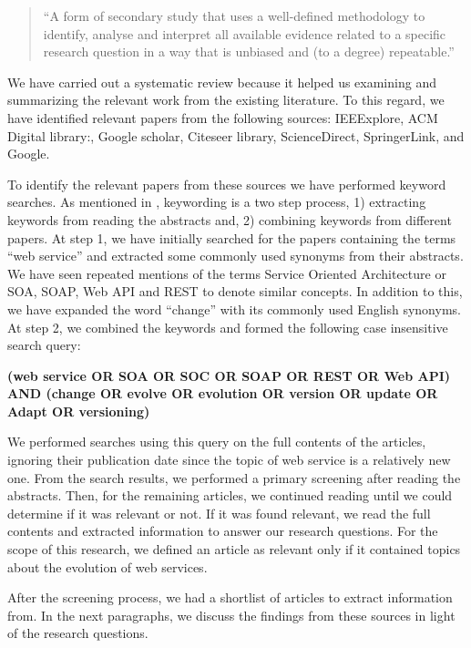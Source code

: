 \documentclass[runningheads,a4paper]{llncs}
\begin{document}
\begin{quote}
``A form of secondary study that uses a well-defined methodology to identify, analyse and interpret all available evidence related to a specific research question in a way that is unbiased and (to a degree) repeatable.''
\end{quote}
We have carried out a systematic review because it helped us examining and summarizing the relevant work from the existing literature. To this regard, we have identified relevant papers from the following sources: IEEExplore, ACM Digital library:, Google scholar, Citeseer library, ScienceDirect, SpringerLink, and Google.

To identify the relevant papers from these sources we have performed keyword searches. As mentioned in \cite{petersen2008systematic}, keywording is a two step process, 1) extracting keywords from reading the abstracts and, 2) combining keywords from different papers. At step 1, we have initially searched for the papers containing the terms ``web service'' and extracted some commonly used synonyms from their abstracts. We have seen repeated mentions of the terms Service Oriented Architecture or SOA, SOAP, Web API and REST to denote similar concepts. In addition to this, we have expanded the word ``change'' with its commonly used English synonyms. At step 2, we combined the keywords and formed the following case insensitive search query:

\textbf{(web service OR SOA OR SOC OR SOAP OR REST OR Web API)  AND (change OR evolve OR evolution OR version OR update OR Adapt OR versioning)}

We performed searches using this query on the full contents of the articles, ignoring their publication date since the topic of web service is a relatively new one. From the search results, we performed a primary screening after reading the abstracts. Then, for the remaining articles, we continued reading until we could determine if it was relevant or not. If it was found relevant, we read the full contents and extracted information to answer our research questions. For the scope of this research, we defined an article as relevant only if it contained topics about the evolution of web services.

After the screening process, we had a shortlist of articles to extract information from. In the next paragraphs, we discuss the findings from these sources in light of the research questions.

\end{document}
